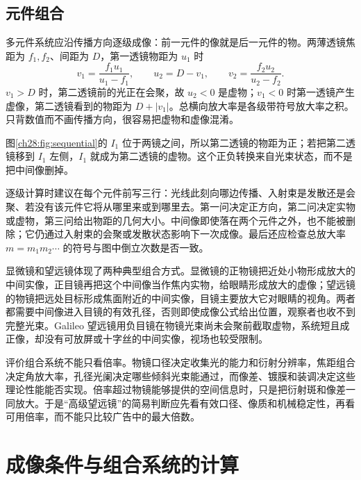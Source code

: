 \SphericalMirrorDiagram

\subsection*{元件组合}

多元件系统应沿传播方向逐级成像：前一元件的像就是后一元件的物。两薄透镜焦距为 $f_1,f_2$、间距为 $D$，第一透镜物距为 $u_1$ 时
\[
 v_1=\frac{f_1u_1}{u_1-f_1},\qquad
 u_2=D-v_1,\qquad
 v_2=\frac{f_2u_2}{u_2-f_2}.
\]
$v_1>D$ 时，第二透镜前的光正在会聚，故 $u_2<0$ 是虚物；$v_1<0$ 时第一透镜产生虚像，第二透镜看到的物距为 $D+|v_1|$。总横向放大率是各级带符号放大率之积。只背数值而不画传播方向，很容易把虚物和虚像混淆。

\SequentialImagingDiagram

图\ref{ch28:fig:sequential}的 $I_1$ 位于两镜之间，所以第二透镜的物距为正；若把第二透镜移到 $I_1$ 左侧，$I_1$ 就成为第二透镜的虚物。这个正负转换来自光束状态，而不是把中间像删掉。

逐级计算时建议在每个元件前写三行：光线此刻向哪边传播、入射束是发散还是会聚、若没有该元件它将从哪里来或到哪里去。第一问决定正方向，第二问决定实物或虚物，第三问给出物距的几何大小。中间像即使落在两个元件之外，也不能被删除；它仍通过入射束的会聚或发散状态影响下一次成像。最后还应检查总放大率 $m=m_1m_2\cdots$ 的符号与图中倒立次数是否一致。

显微镜和望远镜体现了两种典型组合方式。显微镜的正物镜把近处小物形成放大的中间实像，正目镜再把这个中间像当作焦内实物，给眼睛形成放大的虚像；望远镜的物镜把远处目标形成焦面附近的中间实像，目镜主要放大它对眼睛的视角。两者都需要中间像进入目镜的有效孔径，否则即使成像公式给出位置，观察者也收不到完整光束。Galileo 望远镜用负目镜在物镜光束尚未会聚前截取虚物，系统短且成正像，却没有可放屏或十字丝的中间实像，视场也较受限制。

评价组合系统不能只看倍率。物镜口径决定收集光的能力和衍射分辨率，焦距组合决定角放大率，孔径光阑决定哪些倾斜光束能通过，而像差、镀膜和装调决定这些理论性能能否实现。倍率超过物镜能够提供的空间信息时，只是把衍射斑和像差一同放大。于是“高级望远镜”的简易判断应先看有效口径、像质和机械稳定性，再看可用倍率，而不能只比较广告中的最大倍数。

\section{成像条件与组合系统的计算}

